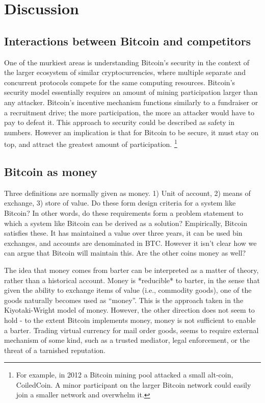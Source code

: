 \section{Discussion}

\subsection{Interactions between Bitcoin and competitors}
One of the murkiest areas is understanding Bitcoin's security in the context of the larger ecosystem of similar cryptocurrencies, where multiple separate and concurrent protocols compete for the same computing resources. Bitcoin's security model essentially requires an amount of mining participation larger than any attacker. Bitcoin's incentive mechanism functions similarly to a fundraiser or a recruitment drive; the more participation, the more an attacker would have to pay to defeat it. This approach to security could be described as safety in numbers. However an implication is that for Bitcoin to be secure, it must stay on top, and attract the greatest amount of participation. \footnote{For example, in 2012 a Bitcoin mining pool attacked a small alt-coin, CoiledCoin. A minor participant on the larger Bitcoin network could easily join a smaller network and overwhelm it. }

\subsection{Bitcoin as money}
Three definitions are normally given as money. 1) Unit of account, 2) means of exchange, 3) store of value. Do these form design criteria for a system like Bitcoin? In other words, do these requirements form a problem statement to which a system like Bitcoin can be derived as a solution? Empirically, Bitcoin satisfies these. It has maintained a value over three years, it can be used bin exchanges, and accounts are denominated in BTC. However it isn't clear how we can argue that Bitcoin will maintain this. Are the other coins money as well?

The idea that money comes from barter can be interpreted as a matter of theory, rather than a historical account. Money is *reducible* to barter, in the sense that given the ability to exchange items of value (i.e., commodity goods), one of the goods naturally becomes used as ``money''. This is the approach taken in the Kiyotaki-Wright model of money. However, the other direction does not seem to hold - to the extent Bitcoin implements money, money is not sufficient to enable a barter. Trading virtual currency for mail order goods, seems to require  external mechanism of some kind, such as a trusted mediator, legal enforcement, or the threat of a tarnished reputation.

